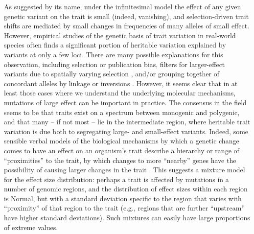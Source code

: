 \documentclass{article}
\newcommand{\1}{\mathbbm{1}}
\theoremstyle{remark}
\theoremstyle{definition}
\begin{document}
As suggested by its name,
under the infinitesimal model the effect of any given genetic variant on the trait
is small (indeed, vanishing),
and selection-driven trait shifts are mediated by small changes in frequencies of many alleles of small effect.
However, empirical studies of the genetic basis of trait variation in real-world species
often finds a significant portion of heritable variation explained by variants at only a few loci.
There are many possible explanations for this observation,
including selection or publication bias,
filters for larger-effect variants due to spatially varying selection
\citep{barton1987establishment,yeaman2011establishment,yeaman2011genetic},
and/or grouping together of concordant alleles by linkage or inversions
\citep{kirkpatrick2006chromosome}.
However,
it seems clear that in at least those cases where we understand the underlying molecular mechanisms,
mutations of large effect can be important in practice.
The consensus in the field seems to be that traits exist on a spectrum between monogenic and polygenic,
and that many -- if not most -- lie in the intermediate region,
where heritable trait variation is due both to segregating large- and small-effect variants.
Indeed, some sensible verbal models of the biological mechanisms by which a genetic change
comes to have an effect on an organism's trait
describe a hierarchy or range of ``proximities'' to the trait,
by which changes to more ``nearby'' genes have the possibility of causing larger changes in the trait
\citep{kopp2012transcriptional,boyle2017expanded}.
This suggests a mixture model for the effect size distribution:
perhaps a trait is affected by mutations in a number of genomic regions,
and the distribution of effect sizes within each region is Normal, 
but with a standard deviation specific to the region that varies with ``proximity'' of that region to the trait
(e.g., regions that are further ``upstream'' have higher standard deviations).
Such mixtures can easily have large proportions of extreme values.
\end{document}
